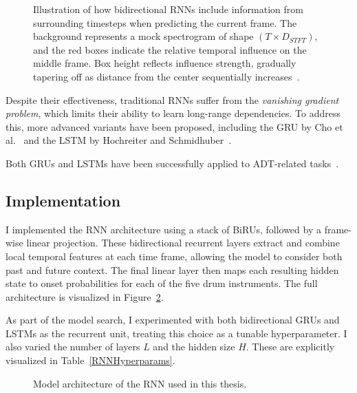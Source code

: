 \begin{figure}[H]
    \centering
    
    \caption{Illustration of how bidirectional \glspl{RNN} include information from surrounding timesteps when predicting the current frame. The background represents a mock spectrogram of shape $(T \times D_{STFT})$, and the red boxes indicate the relative temporal influence on the middle frame. Box height reflects influence strength, gradually tapering off as distance from the center sequentially increases~\cite{Vogl2017DrumTV}.}
    \label{RNNInfluenceFigure}
\end{figure}

Despite their effectiveness, traditional \glspl{RNN} suffer from the \textit{vanishing gradient problem}, which limits their ability to learn long-range dependencies. To address this, more advanced variants have been proposed, including the \gls{GRU} by Cho et al.~\cite{DBLP:conf/emnlp/ChoMGBBSB14} and the \gls{LSTM} by Hochreiter and Schmidhuber~\cite{10.1162/neco.1997.9.8.1735}.

Both \glspl{GRU} and \glspl{LSTM} have been successfully applied to \gls{ADT}-related tasks~\cite{Southall2016AutomaticDT, vogl2016recurrent, Vogl2017DrumTV, signals4040042}.

\subsection{Implementation}

I implemented the \gls{RNN} architecture using a stack of \glspl{BiRU}, followed by a frame-wise linear projection. These bidirectional recurrent layers extract and combine local temporal features at each time frame, allowing the model to consider both past and future context. The final linear layer then maps each resulting hidden state to onset probabilities for each of the five drum instruments. The full architecture is visualized in Figure~\ref{RNNFigure}.

As part of the model search, I experimented with both bidirectional \glspl{GRU} and \glspl{LSTM} as the recurrent unit, treating this choice as a tunable hyperparameter. I also varied the number of layers $L$ and the hidden size $H$. These are explicitly visualized in Table~\ref{RNNHyperparams}.

\begin{figure}[H]
    \centering
    
    \caption{Model architecture of the \acrlong{RNN} used in this thesis.}
    \label{RNNFigure}
\end{figure}

